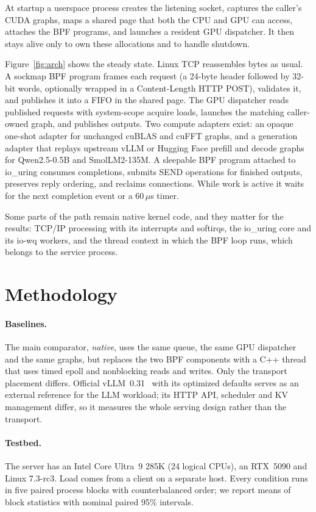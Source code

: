 \documentclass[sigconf,nonacm]{acmart}
\newcommand{\us}{\,$\mu$s}
\begin{document}
At startup a userspace process creates the listening socket, captures the
caller's CUDA graphs, maps a shared page that both the CPU and GPU can access,
attaches the BPF programs, and launches a resident GPU dispatcher. It then stays
alive only to own these allocations and to handle shutdown.

Figure~\ref{fig:arch} shows the steady state. Linux TCP reassembles bytes as
usual. A sockmap BPF program frames each request (a 24-byte header followed by
32-bit words, optionally wrapped in a Content-Length HTTP POST), validates it,
and publishes it into a FIFO in the shared page. The GPU dispatcher reads
published requests with system-scope acquire loads, launches the matching
caller-owned graph, and publishes outputs. Two compute adapters exist: an opaque
one-shot adapter for unchanged cuBLAS and cuFFT graphs, and a generation adapter
that replays upstream vLLM or Hugging Face prefill and decode graphs for
Qwen2.5-0.5B and SmolLM2-135M. A sleepable BPF program attached to io\_uring
consumes completions, submits SEND operations for finished outputs, preserves
reply ordering, and reclaims connections. While work is active it waits for the
next completion event or a 60\us{} timer.

Some parts of the path remain native kernel code, and they matter for the
results: TCP/IP processing with its interrupts and softirqs, the io\_uring core
and its io-wq workers, and the thread context in which the BPF loop runs, which
belongs to the service process.

\section{Methodology}
\label{sec:method}

\paragraph{Baselines.} The main comparator, \emph{native}, uses the same queue,
the same GPU dispatcher and the same graphs, but replaces the two BPF components
with a C++ thread that uses timed epoll and nonblocking reads and writes. Only
the transport placement differs. Official vLLM~0.31~\cite{vllm} with its optimized defaults
serves as an external reference for the LLM workload; its HTTP API, scheduler
and KV management differ, so it measures the whole serving design rather than
the transport.

\paragraph{Testbed.} The server has an Intel Core Ultra~9 285K (24 logical
CPUs), an RTX~5090 and Linux 7.3-rc3. Load comes from a client on a separate
host. Every condition runs in five paired process blocks with counterbalanced
order; we report means of block statistics with nominal paired 95\% intervals.
\end{document}
